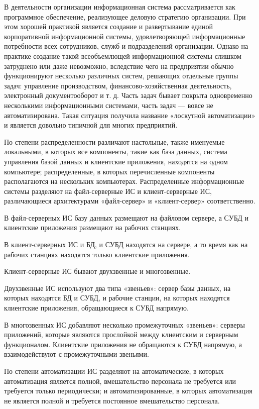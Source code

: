 В деятельности организации информационная система рассматривается как программное обеспечение, реализующее деловую стратегию организации. При этом хорошей практикой является создание и развертывание единой корпоративной информационной системы, удовлетворяющей информационные потребности всех сотрудников, служб и подразделений организации. Однако на практике создание такой всеобъемлющей информационной системы слишком затруднено или даже невозможно, вследствие чего на предприятии обычно функционируют несколько различных систем, решающих отдельные группы задач: управление производством, финансово-хозяйственная деятельность, электронный документооборот и т. д. Часть задач бывает покрыта одновременно несколькими информационными системами, часть задач — вовсе не автоматизирована. Такая ситуация получила название «лоскутной автоматизации» и является довольно типичной для многих предприятий.

По степени распределенности различают настольные, также именуемые локальными, в которых все компоненты, такие как база данных, система управления базой данных и клиентские приложения, находятся на одном компьютере; распределенные, в которых перечисленные компоненты располагаются на нескольких компьютерах. Распределенные информационные системы разделяют на файл-серверные ИС и клиент-серверные ИС, различающиеся архитектурами «файл-сервер» и «клиент-сервер» соответственно.

В файл-серверных ИС базу данных размещают на файловом сервере, а СУБД и клиентские приложения размещают на рабочих станциях.

В клиент-серверных ИС и БД, и СУБД находятся на сервере, а то время как на рабочих станциях находятся только клиентские приложения.

Клиент-серверные ИС бывают двухзвенные и многозвенные.

Двухзвенные ИС используют два типа «звеньев»: сервер базы данных, на которых находятся БД и СУБД, и рабочие станции, на которых находятся клиентские приложения, обращающиеся к СУБД напрямую.

В многозвенных ИС добавляют несколько промежуточных «звеньев»: серверы приложений, которые являются прослойкой между клиентским и серверным функционалом. Клиентские приложения не обращаются к СУБД напрямую, а взаимодействуют с промежуточными звеньями.

По степени автоматизации ИС разделяют на автоматические, в которых автоматизация является полной, вмешательство персонала не требуется или требуется только периодически; и автоматизированные, в которых автоматизация не является полной и требуется постоянное вмешательство персонала.


